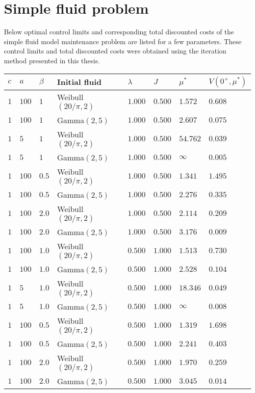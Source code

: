 \section{Simple fluid problem}
Below optimal control limits and corresponding total discounted costs of the simple fluid model maintenance problem are listed for a few parameters.
These control limits and total discounted costs were obtained using the iteration method presented in this thesis.
\begin{tabularx}{\linewidth}{llllllll}\label{table:SimpleFluidComputations}
	$c$        & $a$ & $\beta$ & Initial fluid & $\lambda$ & $J$ & $\mu^*$ & $V(0^+,\mu^*)$        \\
	\hline    
	  $1$ & $100$ & $1$ & Weibull$(20/\pi,2)$ & $1.000$ & $0.500$ & $1.572$ & $0.608$ \\ 
	  $1$ & $100$ & $1$ & Gamma$(2,5)$ & $1.000$ & $0.500$ & $2.607$ & $0.075$ \\ 
	  $1$ & $5$ & $1$ & Weibull$(20/\pi,2)$ & $1.000$ & $0.500$ & $54.762$ & $0.039$ \\ 
	  $1$ & $5$ & $1$ & Gamma$(2,5)$ & $1.000$ & $0.500$ & $\infty$ & $0.005$ \\ 
	  $1$ & $100$ & $0.5$ & Weibull$(20/\pi,2)$ & $1.000$ & $0.500$ & $1.341$ & $1.495$ \\ 
	  $1$ & $100$ & $0.5$ & Gamma$(2,5)$ & $1.000$ & $0.500$ & $2.276$ & $0.335$ \\ 
	  $1$ & $100$ & $2.0$ & Weibull$(20/\pi,2)$ & $1.000$ & $0.500$ & $2.114$ & $0.209$ \\ 
	  $1$ & $100$ & $2.0$ & Gamma$(2,5)$ & $1.000$ & $0.500$ & $3.176$ & $0.009$ \\ 
	  $1$ & $100$ & $1.0$ & Weibull$(20/\pi,2)$ & $0.500$ & $1.000$ & $1.513$ & $0.730$ \\ 
	  $1$ & $100$ & $1.0$ & Gamma$(2,5)$ & $0.500$ & $1.000$ & $2.528$ & $0.104$ \\ 
	  $1$ & $5$ & $1.0$ & Weibull$(20/\pi,2)$ & $0.500$ & $1.000$ & $18.346$ & $0.049$ \\ 
	  $1$ & $5$ & $1.0$ & Gamma$(2,5)$ & $0.500$ & $1.000$ & $\infty$ & $0.008$ \\ 
	  $1$ & $100$ & $0.5$ & Weibull$(20/\pi,2)$ & $0.500$ & $1.000$ & $1.319$ & $1.698$ \\ 
	  $1$ & $100$ & $0.5$ & Gamma$(2,5)$ & $0.500$ & $1.000$ & $2.241$ & $0.403$ \\ 
	  $1$ & $100$ & $2.0$ & Weibull$(20/\pi,2)$ & $0.500$ & $1.000$ & $1.970$ & $0.259$ \\ 
	  $1$ & $100$ & $2.0$ & Gamma$(2,5)$ & $0.500$ & $1.000$ & $3.045$ & $0.014$ \\ 
\end{tabularx}

